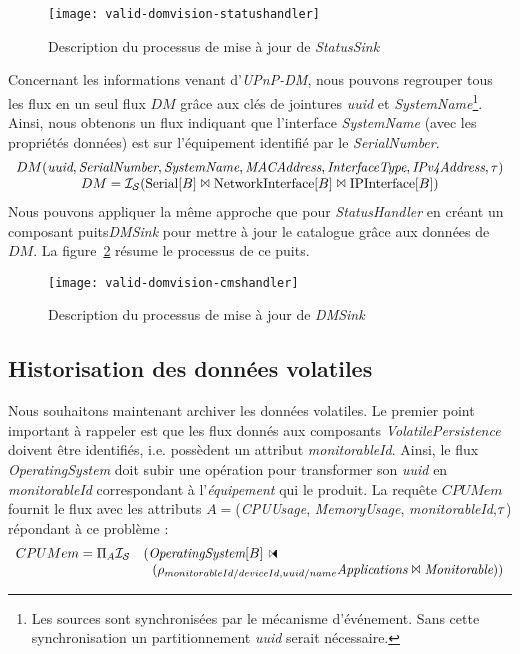 \begin{figure}[ht]
	\texttt{[image: valid-domvision-statushandler]}
	\caption{Description du processus de mise à jour de \textit{StatusSink}}\label{fig:valid:domvision:statushandler}
\end{figure}

Concernant les informations venant d'\textit{UPnP-DM}, nous pouvons regrouper tous les flux en un seul flux $DM$ grâce aux clés de jointures \textit{uuid} et \textit{SystemName}\footnote{Les sources sont synchronisées par le mécanisme d'événement. Sans cette synchronisation un partitionnement \textit{uuid} serait nécessaire.}. Ainsi, nous obtenons un flux indiquant que l'interface \textit{SystemName} (avec les propriétés données) est sur l'équipement identifié par le \textit{SerialNumber}. 
$$\begin{array}{c} DM(\textit{uuid},\textit{SerialNumber},\textit{SystemName},\textit{MACAddress},\textit{InterfaceType}, \textit{IPv4Address}, \tau)\\
 DM = \mathcal{I_S}(\textrm{Serial}[B] \Join \textrm{NetworkInterface}[B] \Join \textrm{IPInterface}[B])\end{array}$$
Nous pouvons appliquer la même approche que pour \textit{StatusHandler} en créant un composant puits\textit{DMSink} pour mettre à jour le catalogue grâce aux données de $DM$. La figure~\ref{fig:valid:domvision:cmshandler} résume le processus de ce puits.
\begin{figure}[ht]
        \texttt{[image: valid-domvision-cmshandler]}
	\caption{Description du processus de mise à jour de \textit{DMSink}}\label{fig:valid:domvision:cmshandler}
\end{figure}

\subsection{Historisation des données volatiles}\label{sec:valid:domvision:requetes:historisation}
Nous souhaitons maintenant archiver les données volatiles. Le premier point important à rappeler est que les flux donnés aux composants \textit{VolatilePersistence} doivent être identifiés, i.e. possèdent un attribut \textit{monitorableId}. Ainsi, le flux \textit{OperatingSystem} doit subir une opération pour transformer son \textit{uuid} en \textit{monitorableId} correspondant à l'\textit{équipement} qui le produit. La requête $CPUMem$ fournit le flux avec les attributs $A=$(\textit{CPUUsage}, \textit{MemoryUsage}, \textit{monitorableId},$\tau$) répondant à ce problème :
$$\begin{array}{rl} CPUMem=\Pi_A \IS & (\textit{OperatingSystem}[B]\ssjoin  \\ & \ \ (\rho_{monitorableId/deviceId,uuid/name}\textit{Applications}\Join \textit{Monitorable}))\end{array}$$


